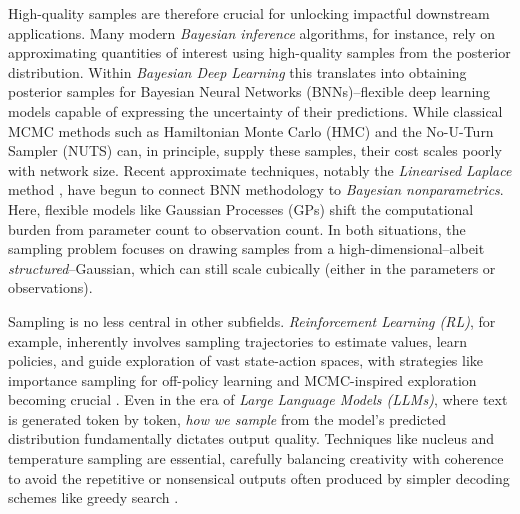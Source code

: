 High-quality samples are therefore crucial for unlocking impactful downstream applications. Many modern \textit{Bayesian inference} algorithms, for instance, rely on approximating quantities of interest using high-quality samples from the posterior distribution. Within \textit{Bayesian Deep Learning} this translates into obtaining posterior samples for Bayesian Neural Networks (BNNs)--flexible deep learning models capable of expressing the uncertainty of their predictions. While classical MCMC methods such as Hamiltonian Monte Carlo (HMC) \citep{duane1987hybrid} and the No-U-Turn Sampler (NUTS) \citep{hoffman2014no} can, in principle, supply these samples, their cost scales poorly with network size. Recent approximate techniques, notably the \emph{Linearised Laplace} method \citep{mackay1992bayesian, immer2021improving, antoran2022adapting}, have begun to connect BNN methodology to \textit{Bayesian nonparametrics}. Here, flexible models like Gaussian Processes (GPs) shift the computational burden from parameter count to observation count. In both situations, the sampling problem focuses on drawing samples from a high-dimensional--albeit \emph{structured}--Gaussian, which can still scale cubically (either in the parameters or observations).

Sampling is no less central in other subfields. \textit{Reinforcement Learning (RL)}, for example, inherently involves sampling trajectories to estimate values, learn policies, and guide exploration of vast state-action spaces, with strategies like importance sampling for off-policy learning and MCMC-inspired exploration becoming crucial \citep{zhou2020posterior, tiapkin2022optimistic, katdare2023marginalized}. Even in the era of \textit{Large Language Models (LLMs)}, where text is generated token by token, \textit{how we sample} from the model's predicted distribution fundamentally dictates output quality. Techniques like nucleus and temperature sampling are essential, carefully balancing creativity with coherence to avoid the repetitive or nonsensical outputs often produced by simpler decoding schemes like greedy search \citep{holtzman2019curious, du2025optimizing}.



